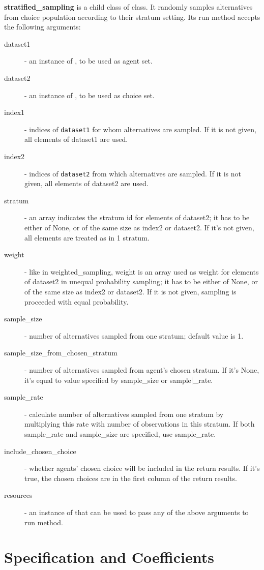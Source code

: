 {{\bf stratified_sampling} is a child class of  class.
It randomly samples alternatives from choice population according to
their stratum setting. Its run method accepts the following
arguments:
\begin{description}
\item[dataset1] - an instance of , \datasetindex to be used as agent set.
\item[dataset2] - an instance of , \datasetindex to be used as choice set.
\item[index1] - indices of \verb|dataset1| for whom alternatives are sampled.
If it is not given, all elements of dataset1 are used.
\item[index2] - indices of \verb|dataset2| from which alternatives are
sampled. If it is not given, all elements of dataset2 are used.
\item[stratum] - an array indicates the stratum id for elements of dataset2; it has
to be either of None, or of the same size as index2 or dataset2. If it's not given,
all elements are treated as in 1 stratum.
\item[weight] - like in weighted_sampling, weight is an array used as weight
for elements of dataset2 in unequal probability sampling; it has to be either
of None, or of the same size as index2 or dataset2. If it is not given, sampling
is proceeded with equal probability.
\item[sample_size] - number of alternatives sampled from one stratum; default value is 1.
\item[sample_size_from_chosen_stratum] - number of alternatives sampled from agent's chosen stratum.
If it's None, it's equal to value specified by sample_size or sample|_rate.
\item[sample_rate] - calculate number of alternatives sampled from one stratum by multiplying this rate with
number of observations in this stratum. If both sample_rate and sample_size are specified, use sample_rate.
\item[include_chosen_choice] - whether agents' chosen choice will be included in
the return results. If it's true, the chosen choices are in the first column of
the return results.
\item[resources] - an instance of  that can be used to pass any of
the above arguments to run method.
\end{description}


\section{Specification and Coefficients}
\label{sec:specification-coefficients}
%
}
